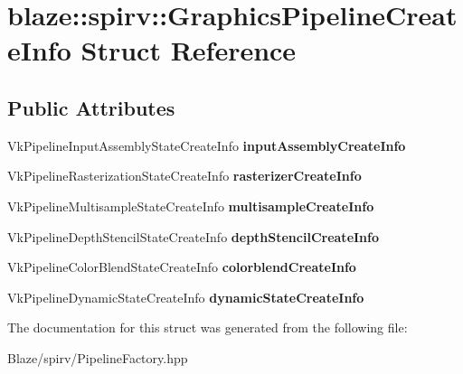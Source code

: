 \hypertarget{structblaze_1_1spirv_1_1GraphicsPipelineCreateInfo}{}\section{blaze\+:\+:spirv\+:\+:Graphics\+Pipeline\+Create\+Info Struct Reference}
\label{structblaze_1_1spirv_1_1GraphicsPipelineCreateInfo}
\subsection*{Public Attributes}
\begin{DoxyCompactItemize}
\item 
\mbox{\label{structblaze_1_1spirv_1_1GraphicsPipelineCreateInfo_a37fa9f7799b1dd1989dc7d0ffacc4c10}} 
Vk\+Pipeline\+Input\+Assembly\+State\+Create\+Info {\bfseries input\+Assembly\+Create\+Info}
\item 
\mbox{\label{structblaze_1_1spirv_1_1GraphicsPipelineCreateInfo_a4f80f5908ec54c092679c52d1bdddbcb}} 
Vk\+Pipeline\+Rasterization\+State\+Create\+Info {\bfseries rasterizer\+Create\+Info}
\item 
\mbox{\label{structblaze_1_1spirv_1_1GraphicsPipelineCreateInfo_a4ef617c6d899d6e016c97f4b11299da0}} 
Vk\+Pipeline\+Multisample\+State\+Create\+Info {\bfseries multisample\+Create\+Info}
\item 
\mbox{\label{structblaze_1_1spirv_1_1GraphicsPipelineCreateInfo_ac463101910672c55a9058485caaf0cf4}} 
Vk\+Pipeline\+Depth\+Stencil\+State\+Create\+Info {\bfseries depth\+Stencil\+Create\+Info}
\item 
\mbox{\label{structblaze_1_1spirv_1_1GraphicsPipelineCreateInfo_a20847ed890473ca28c8e7bf150679ce8}} 
Vk\+Pipeline\+Color\+Blend\+State\+Create\+Info {\bfseries colorblend\+Create\+Info}
\item 
\mbox{\label{structblaze_1_1spirv_1_1GraphicsPipelineCreateInfo_a651e55d7f2be410a195684313cf780e0}} 
Vk\+Pipeline\+Dynamic\+State\+Create\+Info {\bfseries dynamic\+State\+Create\+Info}
\end{DoxyCompactItemize}


The documentation for this struct was generated from the following file\+:\begin{DoxyCompactItemize}
\item 
Blaze/spirv/Pipeline\+Factory.\+hpp\end{DoxyCompactItemize}
